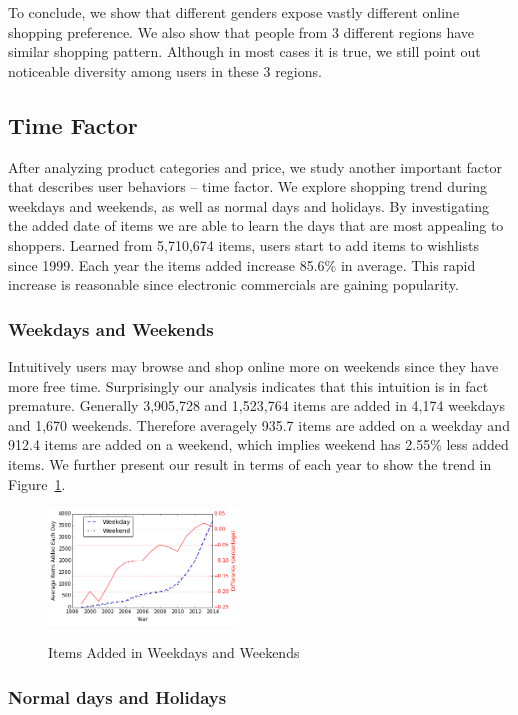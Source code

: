 To conclude, we show that different genders expose vastly different online shopping preference. We also show that people from 3 different regions have similar shopping pattern. Although in most cases it is true, we still point out noticeable diversity among users in these 3 regions. 

\subsection{Time Factor}
After analyzing product categories and price, we study another important factor that describes user behaviors -- time factor. We explore shopping trend during weekdays and weekends, as well as normal days and holidays. By investigating the added date of items we are able to learn the days that are most appealing to shoppers. Learned from 5,710,674 items, users start to add items to wishlists since 1999. Each year the items added increase 85.6\% in average. This rapid increase is reasonable since electronic commercials are gaining popularity. 

\subsubsection{Weekdays and Weekends}
Intuitively users may browse and shop online more on weekends since they have more free time. Surprisingly our analysis indicates that this intuition is in fact premature. Generally 3,905,728 and 1,523,764 items are added in 4,174 weekdays and 1,670 weekends. Therefore averagely 935.7 items are added on a weekday and 912.4 items are added on a weekend, which implies weekend has 2.55\% less added items. We further present our result in terms of each year to show the trend in Figure~\ref{fig:week}.


\begin{figure}[h!]
\centering
  \caption{Items Added in Weekdays and Weekends}{}
  \label{fig:week}
  \centering
    \includegraphics[width=0.45\textwidth]{weekday.png}
\end{figure}

\subsubsection{Normal days and Holidays}

